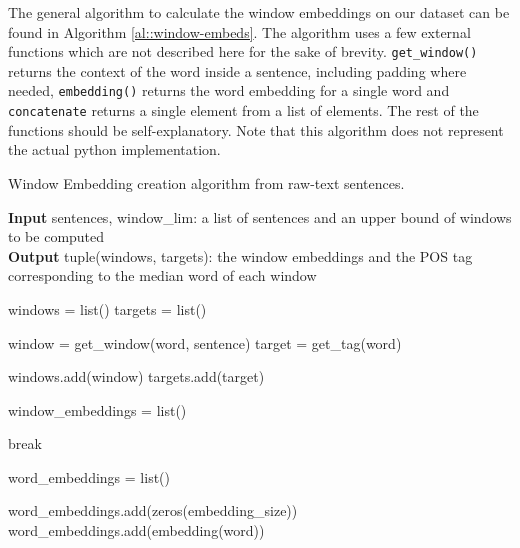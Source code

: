 \documentclass[11pt, a4paper]{article}
\begin{document}
	The general algorithm to calculate the window embeddings on our dataset can be found in Algorithm \ref{al::window-embeds}. The algorithm uses a few external functions which are not described here for the sake of brevity. \texttt{get\_window()} returns the context of the word inside a sentence, including padding where needed, \texttt{embedding()} returns the word embedding for a single word and \texttt{concatenate} returns a single element from a list of elements. The rest of the functions should be self-explanatory.  Note that this algorithm does not represent the actual python implementation.
	
	\begin{algorithm}
		\caption{Window Embedding creation algorithm from raw-text sentences.} 
		\label{al::window-embeds}
		
		\hspace*{\algorithmicindent} \textbf{Input} sentences, window\_lim: a list of sentences and an upper bound of windows to be computed\\
		\hspace*{\algorithmicindent} \textbf{Output} tuple(windows, targets): the window embeddings and the POS tag corresponding to the median word of each window
		\begin{algorithmic}[1]	
			\State windows = list()
			\State targets = list()
			
			\State %
			
			
					\State window = get\_window(word, sentence)
					\State target = get\_tag(word)
					
					\State windows.add(window)
					\State targets.add(target)
				\EndFor
			
			\EndFor
			
			\State %
			
			\State window\_embeddings = list()
			
					\State break
				\EndIf
				
				\State %
				
				\State word\_embeddings = list()
				
				
				
						\State word\_embeddings.add(zeros(embedding\_size))
					\Else
						\State word\_embeddings.add(embedding(word))
					\EndIf
					

\end{algorithmic}
\end{algorithm}
\end{document}
